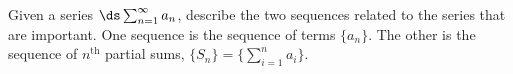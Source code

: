 {Given a series $\ds \sum_{n=1}^\infty a_n$, describe the two sequences related to the series that are important.
}
{One sequence is the sequence of terms $\{a_n\}$. The other is the sequence of $n^\text{th}$ partial sums, $\{S_n\} = \{\sum_{i=1}^n a_i\}$.
}